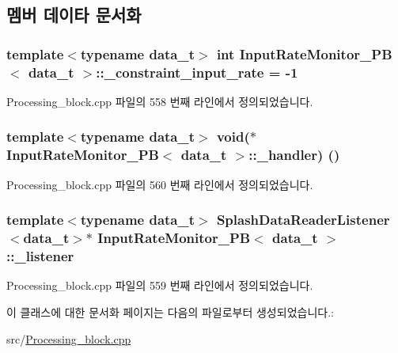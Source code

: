 \subsection{멤버 데이타 문서화}
\subsubsection[{\texorpdfstring{\+\_\+constraint\+\_\+input\+\_\+rate}{_constraint_input_rate}}]{\setlength{\rightskip}{0pt plus 5cm}template$<$typename data\+\_\+t$>$ int {\bf Input\+Rate\+Monitor\+\_\+\+PB}$<$ data\+\_\+t $>$\+::\+\_\+constraint\+\_\+input\+\_\+rate = -\/1\hspace{0.3cm}{\ttfamily [private]}}\hypertarget{classInputRateMonitor__PB_a1294a164e2a5c966599d0802cf4fed24}{}\label{classInputRateMonitor__PB_a1294a164e2a5c966599d0802cf4fed24}


Processing\+\_\+block.\+cpp 파일의 558 번째 라인에서 정의되었습니다.

\subsubsection[{\texorpdfstring{\+\_\+handler}{_handler}}]{\setlength{\rightskip}{0pt plus 5cm}template$<$typename data\+\_\+t$>$ void($\ast$ {\bf Input\+Rate\+Monitor\+\_\+\+PB}$<$ data\+\_\+t $>$\+::\+\_\+handler) ()\hspace{0.3cm}{\ttfamily [private]}}\hypertarget{classInputRateMonitor__PB_ab8e00bdce1779070b9587f477ee281a7}{}\label{classInputRateMonitor__PB_ab8e00bdce1779070b9587f477ee281a7}


Processing\+\_\+block.\+cpp 파일의 560 번째 라인에서 정의되었습니다.

\subsubsection[{\texorpdfstring{\+\_\+listener}{_listener}}]{\setlength{\rightskip}{0pt plus 5cm}template$<$typename data\+\_\+t$>$ {\bf Splash\+Data\+Reader\+Listener}$<$data\+\_\+t$>$$\ast$ {\bf Input\+Rate\+Monitor\+\_\+\+PB}$<$ data\+\_\+t $>$\+::\+\_\+listener\hspace{0.3cm}{\ttfamily [private]}}\hypertarget{classInputRateMonitor__PB_a5d9bb568b165fe454daced915ecc6c7e}{}\label{classInputRateMonitor__PB_a5d9bb568b165fe454daced915ecc6c7e}


Processing\+\_\+block.\+cpp 파일의 559 번째 라인에서 정의되었습니다.



이 클래스에 대한 문서화 페이지는 다음의 파일로부터 생성되었습니다.\+:\begin{DoxyCompactItemize}
\item 
src/\hyperlink{Processing__block_8cpp}{Processing\+\_\+block.\+cpp}\end{DoxyCompactItemize}
